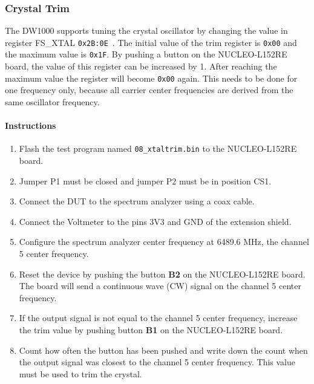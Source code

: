 \documentclass[journal,comsoc]{IEEEtran}
\begin{document}
\subsubsection{Crystal Trim}
\label{subsubsec:crystaltrim}
The DW1000 supports tuning the crystal oscillator by changing the value in register FS\_XTAL \texttt{0x2B:0E}~\cite[Section 7.2.44.5]{dw1000um}. The initial value of the trim register is \texttt{0x00} and the maximum value is \texttt{0x1F}. By pushing a button on the NUCLEO-L152RE board, the value of this register can be increased by 1. After reaching the maximum value the register will become \texttt{0x00} again.
This needs to be done for one frequency only, because all carrier center frequencies are derived from the same oscillator frequency.
\paragraph{Instructions}
\begin{enumerate}
	\item Flash the test program named \texttt{08\_xtaltrim.bin} to the NUCLEO-L152RE board.
	\item Jumper P1 must be closed and jumper P2 must be in position CS1. %
	\item Connect the DUT to the spectrum analyzer using a coax cable.
	\item Connect the Voltmeter to the pins 3V3 and GND of the extension shield.
	\item Configure the spectrum analyzer center frequency at 6489.6 MHz, the channel 5 center frequency.
	\item Reset the device by pushing the button \textbf{B2} on the NUCLEO-L152RE board. The board will send a continuous wave (CW) signal on the channel 5 center frequency.
	\item If the output signal is not equal to the channel 5 center frequency, increase the trim value by pushing button \textbf{B1} on the NUCLEO-L152RE board.
	\item Count how often the button has been pushed and write down the count when the output signal was closest to the channel 5 center frequency. This value must be used to trim the crystal.
\end{enumerate}
\end{document}
